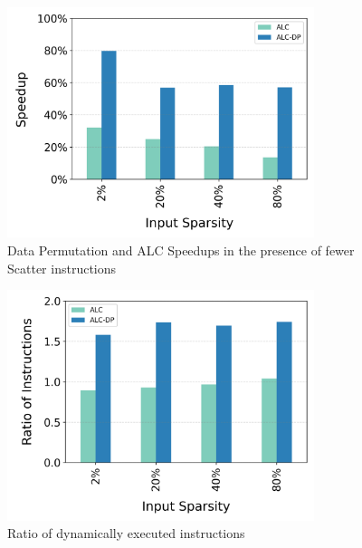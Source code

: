 \begin{figure}[t]
  \includegraphics[width=0.8\textwidth]{Figures/Evaluations/if_then_else_few_scatter_speedup.png}
  \caption{Data Permutation and ALC Speedups in the presence of fewer Scatter instructions}
  \label{fig:if-then-else-few-scatter-speedup}
\end{figure}

\begin{figure}[t]
  \includegraphics[width=0.8\textwidth]{Figures/Evaluations/if_then_else_few_scatter_instr.png}
  \caption{Ratio of dynamically executed instructions}
  \label{fig:if-then-else-few-scatter-inst}
\end{figure}

